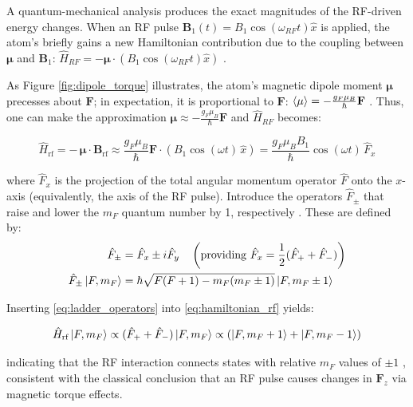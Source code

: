 \documentclass[11pt]{article}
\begin{document}
A quantum-mechanical analysis produces the exact magnitudes of
the RF-driven energy changes. When an RF pulse $\mathbf{B}_1(t) = B_1
\cos(\omega_{RF} t) \hat x$ is
applied, the atom's briefly gains a new Hamiltonian contribution due
to the coupling between $\mathbf{\mu}$ and $\mathbf{B}_1$: $\hat H_{RF} =
-\mathbf{\mu} \cdot \left( B_1 \cos(\omega_{RF} t) \hat x \right)$
\cite{qmech}.

As Figure \ref{fig:dipole_torque} illustrates, the atom's magnetic dipole
moment $\mathbf{\mu}$ precesses about $\mathbf{F}$; in expectation, it is
proportional to $\mathbf{F}$: $\braket{\mathbf{\mu}} = -\frac{g_F \mu_B}{\hbar}
\mathbf{F}$ \cite{harris}. Thus, one can make the approximation $\mathbf{\mu}
\approx -\frac{g_F
\mu_B}{\hbar} \mathbf{F}$ and $\hat H_{RF}$ becomes:


\begin{equation}
  \hat H_{\text{rf}}
  = -\,{\boldsymbol{\mu}}\cdot \mathbf B_{\text{rf}}
  \approx \frac{g_F \mu_B}{\hbar}\mathbf F \cdot \left(B_1 \cos(\omega
  t)\,\hat x\right)
  = \frac{g_F \mu_B B_1}{\hbar}\cos(\omega t)\, \hat F_x
  \label{eq:hamiltonian_rf}
\end{equation}

where $\hat F_x$ is the projection of the total angular momentum
operator $\hat F$ onto the $x$-axis (equivalently, the axis of the RF
pulse). Introduce the operators $\hat F_\pm$ that raise and lower the
$m_F$ quantum number by 1, respectively \cite{qmech}. These are defined by:
\begin{align}
  \hat F_\pm &= \hat F_x \pm i \hat F_y \quad \left (\text{providing
    } \hat F_x =
  \frac{1}{2} (\hat F_+ + \hat F_-) \right )\\
  \hat F_\pm \ket{F, m_F} &= \hbar \sqrt{F(F+1) - m_F(m_F \pm 1)} \ket{F,
  m_F \pm 1}
  \label{eq:ladder_operators}
\end{align}

Inserting \eqref{eq:ladder_operators} into \eqref{eq:hamiltonian_rf}
yields:

\begin{equation}
  \hat H_{\text{rf}} \ket{F, m_F} \propto (\hat F_+ + \hat F_-) \ket{F,
  m_F} \propto \left( \ket {F, m_F + 1 } + \ket {F,
  m_F - 1 } \right)
\end{equation}

indicating that the RF interaction connects states with relative
$m_F$ values of $\pm 1$ \cite{qmech}, consistent with the classical conclusion
that an RF pulse causes changes in $\mathbf{F}_z$ via
magnetic torque effects.
\end{document}
